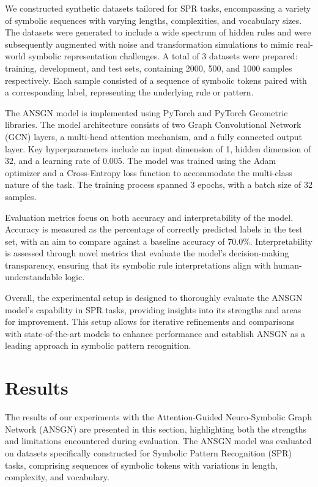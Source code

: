 \documentclass{article}
\begin{document}
We constructed synthetic datasets tailored for SPR tasks, encompassing a variety of symbolic sequences with varying lengths, complexities, and vocabulary sizes. The datasets were generated to include a wide spectrum of hidden rules and were subsequently augmented with noise and transformation simulations to mimic real-world symbolic representation challenges. A total of 3 datasets were prepared: training, development, and test sets, containing 2000, 500, and 1000 samples respectively. Each sample consisted of a sequence of symbolic tokens paired with a corresponding label, representing the underlying rule or pattern.

The ANSGN model is implemented using PyTorch and PyTorch Geometric libraries. The model architecture consists of two Graph Convolutional Network (GCN) layers, a multi-head attention mechanism, and a fully connected output layer. Key hyperparameters include an input dimension of 1, hidden dimension of 32, and a learning rate of 0.005. The model was trained using the Adam optimizer and a Cross-Entropy loss function to accommodate the multi-class nature of the task. The training process spanned 3 epochs, with a batch size of 32 samples.

Evaluation metrics focus on both accuracy and interpretability of the model. Accuracy is measured as the percentage of correctly predicted labels in the test set, with an aim to compare against a baseline accuracy of 70.0\%. Interpretability is assessed through novel metrics that evaluate the model’s decision-making transparency, ensuring that its symbolic rule interpretations align with human-understandable logic.

Overall, the experimental setup is designed to thoroughly evaluate the ANSGN model's capability in SPR tasks, providing insights into its strengths and areas for improvement. This setup allows for iterative refinements and comparisons with state-of-the-art models to enhance performance and establish ANSGN as a leading approach in symbolic pattern recognition.

\section{Results}
The results of our experiments with the Attention-Guided Neuro-Symbolic Graph Network (ANSGN) are presented in this section, highlighting both the strengths and limitations encountered during evaluation. The ANSGN model was evaluated on datasets specifically constructed for Symbolic Pattern Recognition (SPR) tasks, comprising sequences of symbolic tokens with variations in length, complexity, and vocabulary.
\end{document}

